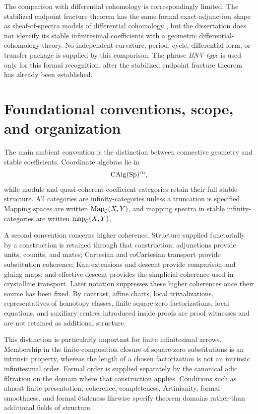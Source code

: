 The comparison with differential cohomology is correspondingly limited.
The stabilized endpoint fracture theorem has the same formal
exact-adjunction shape as sheaf-of-spectra models of differential cohomology
\cite{HopkinsSinger2005,BNV2016}, but the dissertation does not identify its
stable infinitesimal coefficients with a geometric differential-cohomology
theory.  No independent curvature, period, cycle, differential-form, or
transfer package is supplied by this comparison.  The phrase \emph{BNV-type}
is used only for this formal recognition, after the stabilized endpoint fracture theorem has already been established.


\section{Foundational conventions, scope, and organization}
\label{sec:intro-foundations-scope}

The main ambient convention is the distinction between connective geometry
and stable coefficients.  Coordinate algebras lie in
\[
    \operatorname{CAlg}(\operatorname{Sp})^{\mathrm{cn}},
\]
while module and quasi-coherent coefficient categories retain their full
stable structure.  All categories are infinity-categories unless a truncation
is specified.  Mapping spaces are written
\(\operatorname{Map}_{\mathcal C}(X,Y)\), and mapping spectra in stable
infinity-categories are written
\(\operatorname{map}_{\mathcal C}(X,Y)\).

A second convention concerns higher coherence.  Structure supplied
functorially by a construction is retained through that construction:
adjunctions provide units, counits, and mates; Cartesian and coCartesian
transport provide substitution coherence; Kan extensions and descent provide
comparison and gluing maps; and effective descent provides the simplicial
coherence used in crystalline transport.  Later notation suppresses these
higher coherences once their source has been fixed.  By contrast, affine
charts, local trivializations, representatives of homotopy classes, finite
square-zero factorizations, local equations, and auxiliary centres introduced
inside proofs are proof witnesses and are not retained as additional
structure.

This distinction is particularly important for finite infinitesimal arrows.
Membership in the finite-composition closure of square-zero substitutions is
an intrinsic property, whereas the length of a chosen factorization is not an
intrinsic infinitesimal order.  Formal order is supplied separately by the
canonical adic filtration on the domain where that construction applies.
Conditions such as almost finite presentation, coherence, completeness,
Artinianity, formal smoothness, and formal \'etaleness likewise specify
theorem domains rather than additional fields of structure.

